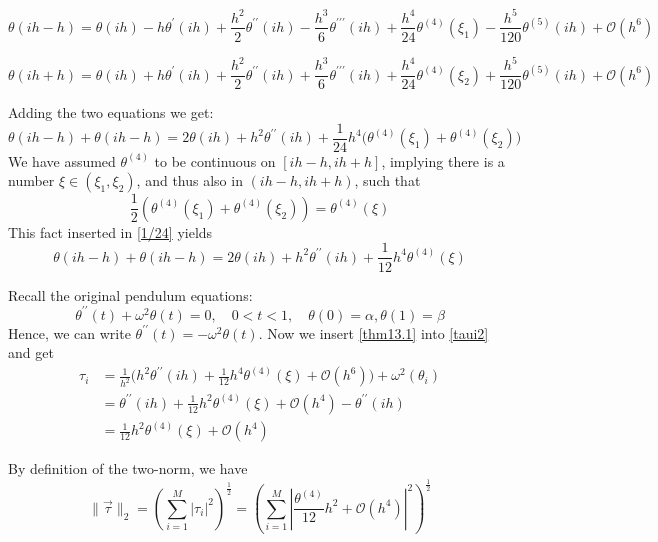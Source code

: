\begin{enumerate}[a)]
\begin{equation*}
  \theta(ih-h)=\theta(ih)-h \theta^{\prime}(ih)+\frac{h^{2}}{2} \theta^{\prime \prime}(ih)-\frac{h^{3}}{6} \theta^{\prime \prime \prime}(ih)+\frac{h^{4}}{24} \theta^{(4)}\left(\xi_{1}\right) - \frac{h^5}{120}
  \theta^{(5)}\left(ih\right) + \mathcal{O}(h^6)
\end{equation*}


\begin{equation*}
  \theta(ih+h)=\theta(ih)+h \theta^{\prime}(ih)+\frac{h^{2}}{2} \theta^{\prime \prime}(ih)+\frac{h^{3}}{6} \theta^{\prime \prime \prime}(ih)+\frac{h^4}{24} \theta^{(4)}\left(\xi_{2}\right)
  + \frac{h^5}{120}
  \theta^{(5)}\left(ih\right) + \mathcal{O}(h^6)
\end{equation*}

  Adding the two equations we get:
  \begin{equation}\label{1/24}
\theta(ih-h)+\theta(ih-h) =
2\theta(ih)+h^2\theta^{\prime \prime}(ih)+\frac{1}{24}h^4\bigg(\theta^{(4)}(\xi_1)+\theta^{(4)}(\xi_2)\bigg)
  \end{equation}
  We have assumed $\theta^{(4)}$ to be continuous on $[ih-h, ih+h]$, implying there is a number $\xi\in(\xi_1,\xi_2)$, and thus also in $(ih-h,ih+h)$, such that
  $$ \frac{1}{2}\left(\theta^{(4)}(\xi_1)+\theta^{(4)}(\xi_2)\right) = \theta^{(4)}(\xi) $$
  This fact inserted in \ref{1/24} yields
  \begin{equation}\label{thm13.1}
    \theta(ih-h)+\theta(ih-h) = 2\theta(ih)+h^2\theta^{\prime \prime}(ih)+\frac{1}{12}h^4\theta^{(4)}(\xi)
  \end{equation}

  Recall the original pendulum equations:
    $$
    \theta^{\prime \prime}(t)+\omega^{2} \theta(t)=0, \quad 0<t<1, \quad \theta(0)=\alpha, \theta(1)=\beta
    $$
Hence, we can write  $ \theta^{\prime \prime}(t)=-\omega^{2}\theta(t)$. Now we insert \ref{thm13.1} into \ref{taui2} and get
\begin{align*}
    \tau_i &=
    \frac{1}{h^2}\bigg(h^2\theta^{\prime \prime}(ih)+\frac{1}{12}h^4\theta^{(4)}(\xi) + \mathcal{O}(h^6)  \bigg) +   \omega^2\left(\theta_{i}\right) \\
    & = \theta^{\prime \prime}(ih)+\frac{1}{12}h^2\theta^{(4)}(\xi) + \mathcal{O}(h^4) -\theta^{\prime\prime}(ih) \\
    & = \frac{1}{12}h^2\theta^{(4)}(\xi) + \mathcal{O}(h^4)
\end{align*}

By definition of the two-norm, we have
  \begin{equation}\label{tau2norm}
    \|\vec{\tau}\|_2 = \left(\sum_{i=1}^{M}|\tau_i|^2\right)^{\frac{1}{2}} = \left(\sum_{i=1}^{M}\left|\frac{\theta^{(4)}}{12}h^2 + \mathcal{O}(h^4)\right|^2\right)^{\frac{1}{2}}
  \end{equation}


\end{enumerate}
